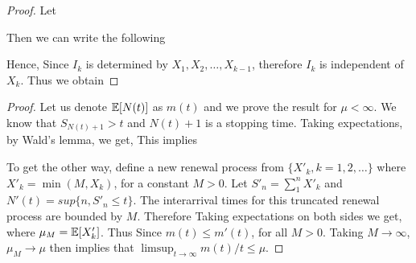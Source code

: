\documentclass[all-lectures.tex]{subfiles}
\begin{document}
\begin{proof}
Let 

Then we can write the following

Hence,
Since $I_k$ is determined by $X_1, X_2, \dots, X_{k-1}$, therefore $I_k$ is independent of $X_k$. Thus we obtain
\end{proof}

\begin{thm}
\end{thm}
\begin{proof}
Let us denote $\mathbb{E}[N(t)]$ as $m(t)$ and we prove the result for $\mu < \infty$. We know that $S_{N(t)+1} > t$ and $N(t)+1$ is a stopping time. Taking expectations, by Wald's lemma, we get,
This implies 

To get the other way, define a new renewal process from $\{ X'_k, k=1,2,\dots \}$ where  $X'_k= \min(M,X_k)$, for a constant $M>0$.
Let $S'_n=\sum_1^n X'_k$ and $N'(t) = sup\{n,S'_n \le t\}$. The interarrival times for this truncated renewal process are bounded by $M$. Therefore
Taking expectations on both sides we get,
where $\mu_M = \mathbb{E}[X'_k]$. Thus
Since $m(t) \leq m'(t)$,
for all $M>0$. Taking $M \to \infty$, $\mu_M \to \mu$ then implies that $\limsup_{t \to \infty} m(t)/t \leq \mu$.
\end{proof}
\end{document}
